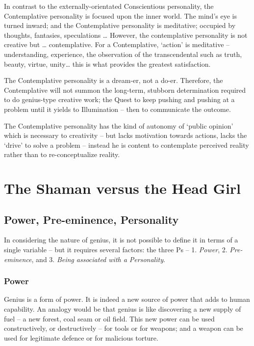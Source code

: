 \documentclass[
]{book}
\begin{document}
In contrast to the externally-orientated Conscientious personality, the Contemplative personality is focused upon the inner world. The mind's eye is turned inward; and the Contemplative personality is meditative; occupied by thoughts, fantasies, speculations \ldots{}
However, the contemplative personality is not creative but \ldots{} contemplative. For a Contemplative, `action' is meditative -- understanding, experience, the observation of the transcendental such as truth, beauty, virtue, unity\ldots{} this is what provides the greatest satisfaction.

The Contemplative personality is a dream-er, not a do-er. Therefore, the Contemplative will not summon the long-term, stubborn determination required to do genius-type creative work; the Quest to keep pushing and pushing at a problem until it yields to Illumination -- then to communicate the outcome.

The Contemplative personality has the kind of autonomy of `public opinion' which is necessary to creativity -- but lacks motivation towards actions, lacks the `drive' to solve a problem -- instead he is content to contemplate perceived reality rather than to re-conceptualize reality.

\hypertarget{the-shaman-versus-the-head-girl}{%
\chapter{The Shaman versus the Head Girl}\label{the-shaman-versus-the-head-girl}}

\hypertarget{power-pre-eminence-personality}{%
\section{Power, Pre-eminence, Personality}\label{power-pre-eminence-personality}}

In considering the nature of genius, it is not possible to define it in terms of a single variable -- but it requires several factors: the three Ps -- 1. \emph{Power}, 2. \emph{Pre-eminence}, and 3. \emph{Being associated with a Personality}.

\hypertarget{power}{%
\subsection{Power}\label{power}}

Genius is a form of power. It is indeed a new source of power that adds to human capability. An analogy would be that genius is like discovering a new supply of fuel -- a new forest, coal seam or oil field. This new power can be used constructively, or destructively -- for tools or for weapons; and a weapon can be used for legitimate defence or for malicious torture.
\end{document}
